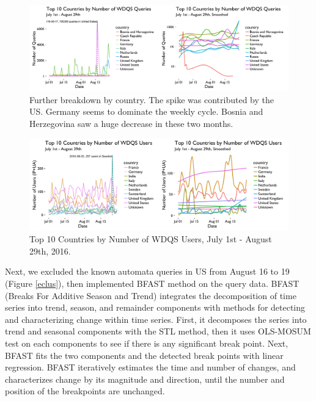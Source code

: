 \documentclass[12pt,]{article}
\begin{document}
\begin{figure}[H]
\centering
\includegraphics{figures/query_country_ts.png}
\caption{Further breakdown by country. The spike was contributed by the
US. Germany seems to dominate the weekly cycle. Bosnia and Herzegovina
saw a huge decrease in these two months.}
\end{figure}

\begin{figure}[H]
\centering
\includegraphics{figures/user_country_ts.png}
\caption{Top 10 Countries by Number of WDQS Users, July 1st - August
29th, 2016.}
\end{figure}

Next, we excluded the known automata queries in US from August 16 to 19
(Figure \ref{eclus}), then implemented BFAST method on the query data.
BFAST (Breaks For Additive Season and Trend) integrates the
decomposition of time series into trend, season, and remainder
components with methods for detecting and characterizing change within
time series. First, it decomposes the series into trend and seasonal
components with the STL method, then it uses OLS-MOSUM test on each
components to see if there is any significant break point. Next, BFAST
fits the two components and the detected break points with linear
regression. BFAST iteratively estimates the time and number of changes,
and characterizes change by its magnitude and direction, until the
number and position of the breakpoints are unchanged.
\end{document}
